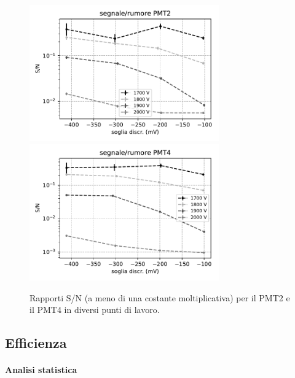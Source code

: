 \documentclass[a4paper]{article}
\begin{document}
\begin{figure}[h]
\centering
\includegraphics[width=22em]{calib_pmt2}
\includegraphics[width=22em]{calib_pmt4}
\caption{Rapporti S/N (a meno di una costante moltiplicativa) per il PMT2 e il PMT4 in diversi punti di lavoro.}
\label{test2}
\end{figure}

\subsection*{Efficienza}

\paragraph{Analisi statistica}
\end{document}
